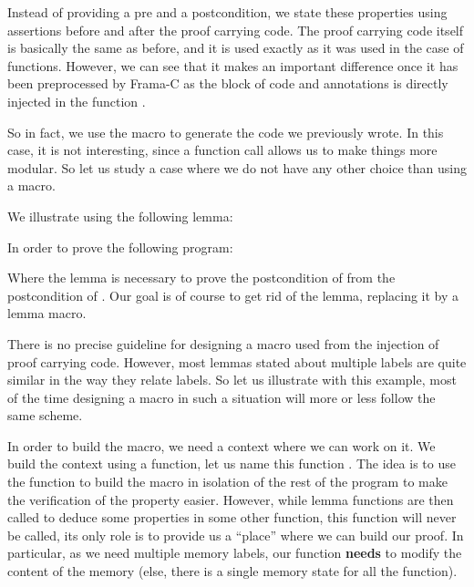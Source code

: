 


Instead of providing a pre and a postcondition, we state these properties using
assertions before and after the proof carrying code. The proof carrying code
itself is basically the same as before, and it is used exactly as it was used in
the case of functions. However, we can see that it makes an important difference
once it has been preprocessed by Frama-C as the block of code and annotations is
directly injected in the function .






So in fact, we use the macro to generate the code we previously wrote. In this
case, it is not interesting, since a function call allows us to make things
more modular. So let us study a case where we do not have any other choice than
using a macro.



We illustrate using the following lemma:





In order to prove the following program:




Where the lemma  is necessary to prove the postcondition
of  from the postcondition of . Our
goal is of course to get rid of the lemma, replacing it by a lemma macro.



There is no precise guideline for designing a macro used from the injection of
proof carrying code. However, most lemmas stated about multiple labels are quite
similar in the way they relate labels. So let us illustrate with this example,
most of the time designing a macro in such a situation will more or less follow
the same scheme.



In order to build the macro, we need a context where we can work on it. We build
the context using a function, let us name this function
. The idea is to use the function to
build the macro in isolation of the rest of the program to make the verification
of the property easier. However, while lemma functions are then called to deduce
some properties in some other function, this function will never be called, its
only role is to provide us a ``place'' where we can build our proof. In
particular, as we need multiple memory labels, our function \textbf{needs} to
modify the content of the memory (else, there is a single memory state for all
the function).



